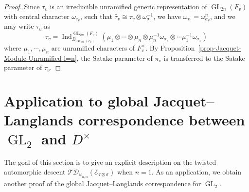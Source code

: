\documentclass[12pt]{amsart}
\newcommand{\wt}{\widetilde}
\newcommand{\TD}{\mathcal{TD}}
\newcommand{\CE}{{\mathcal{E}}}
\theoremstyle{remark}
\DeclareMathOperator{\Ind}{Ind}
\DeclareMathOperator{\GL}{GL}
\begin{document}
\begin{proof}
Since $\tau_v$ is an irreducible unramified generic representation of $\GL_{2n}(F_v)$ with central character $\omega_{\tau_v}$, such that $\wt{\tau_v}\cong \tau_v\otimes\omega_{\sigma_v}^{-1}$, we have $\omega_{\tau_v}=\omega_{\sigma_v}^n$, and we may write $\tau_v$ as 
\begin{equation*}
\tau_v=\Ind_{B_{\GL_{2n}(F_v)}}^{\GL_{2n}(F_v)} (\mu_1 \otimes   \cdots \otimes 	\mu_n \otimes \mu_n^{-1}  \omega_{\sigma_v} \otimes \cdots \mu_1^{-1}\omega_{\sigma_v})
\end{equation*}
where $\mu_1, \cdots, \mu_n$ are unramified characters of $F_v^\times$.  
By Proposition~\ref{prop-Jacquet-Module-Unramified-l=n}, the Satake parameter of $\pi_v$ is transferred to the Satake parameter of $\tau_v$. 
\end{proof}


\section{Application to global Jacquet--Langlands correspondence between $\GL_2$ and $D^\times$}
\label{section-application-JacquetLanglands}
The goal of this section is to give an explicit description on the twisted automorphic descent $\TD_{\psi_{n,\alpha}}(\CE_{\tau\otimes\sigma})$ when $n=1$. 
As an application, we obtain another proof of the global Jacquet--Langlands correspondence for $\GL_2$. 
\end{document}
